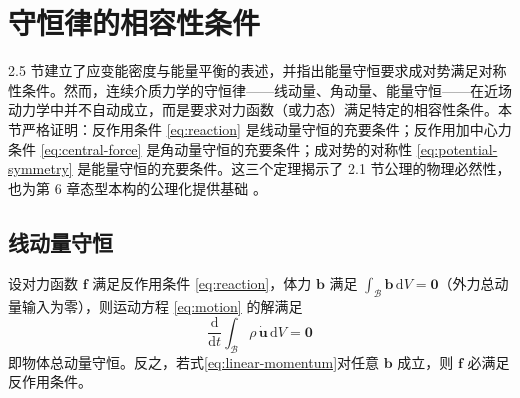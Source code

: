 \section{守恒律的相容性条件}

2.5 节建立了应变能密度与能量平衡的表述，并指出能量守恒要求成对势满足对称性条件。然而，连续介质力学的守恒律——线动量、角动量、能量守恒——在近场动力学中并不自动成立，而是要求对力函数（或力态）满足特定的相容性条件。本节严格证明：反作用条件 \eqref{eq:reaction} 是线动量守恒的充要条件；反作用加中心力条件 \eqref{eq:central-force} 是角动量守恒的充要条件；成对势的对称性 \eqref{eq:potential-symmetry} 是能量守恒的充要条件。这三个定理揭示了 2.1 节公理的物理必然性，也为第 6 章态型本构的公理化提供基础 \cite{SillingLehoucq2010}。

\subsection{线动量守恒}

\begin{theorem}[线动量守恒]
  设对力函数 $\mathbf{f}$ 满足反作用条件 \eqref{eq:reaction}，体力 $\mathbf{b}$ 满足 $\int_{\mathcal{B}}\mathbf{b}\,\mathrm{d}V=\mathbf{0}$（外力总动量输入为零），则运动方程 \eqref{eq:motion} 的解满足
  \begin{equation}
    \frac{\mathrm{d}}{\mathrm{d}t}\int_{\mathcal{B}}\rho\,\dot{\mathbf{u}}\,\mathrm{d}V=\mathbf{0}
    \label{eq:linear-momentum}
  \end{equation}
  即物体总动量守恒。反之，若式\eqref{eq:linear-momentum}对任意 $\mathbf{b}$ 成立，则 $\mathbf{f}$ 必满足反作用条件。
  \label{thm:linear-momentum}
\end{theorem}

